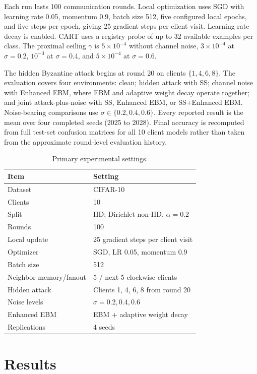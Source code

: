 \documentclass[conference]{IEEEtran}
\begin{document}
Each run lasts 100 communication rounds. Local optimization uses SGD with learning rate 0.05, momentum 0.9, batch size 512, five configured local epochs, and five steps per epoch, giving 25 gradient steps per client visit. Learning-rate decay is enabled. CART uses a registry probe of up to 32 available examples per class. The proximal ceiling $\gamma$ is $5\times10^{-4}$ without channel noise, $3\times10^{-4}$ at $\sigma=0.2$, $10^{-3}$ at $\sigma=0.4$, and $5\times10^{-4}$ at $\sigma=0.6$.

The hidden Byzantine attack begins at round 20 on clients $\{1,4,6,8\}$. The evaluation covers four environments: clean; hidden attack with SS; channel noise with Enhanced EBM, where EBM and adaptive weight decay operate together; and joint attack-plus-noise with SS, Enhanced EBM, or SS+Enhanced EBM. Noise-bearing comparisons use $\sigma\in\{0.2,0.4,0.6\}$. Every reported result is the mean over four completed seeds (2025 to 2028). Final accuracy is recomputed from full test-set confusion matrices for all 10 client models rather than taken from the approximate round-level evaluation history.

\begin{table}[t]
\caption{Primary experimental settings.}
\label{tab:setup}
\centering
\footnotesize
\setlength{\tabcolsep}{3.5pt}
\begin{tabular}{@{}ll@{}}
\toprule
\textbf{Item} & \textbf{Setting} \\
\midrule
Dataset & CIFAR-10 \\
Clients & 10 \\
Split & IID; Dirichlet non-IID, $\alpha=0.2$ \\
Rounds & 100 \\
Local update & 25 gradient steps per client visit \\
Optimizer & SGD, LR 0.05, momentum 0.9 \\
Batch size & 512 \\
Neighbor memory/fanout & 5 / next 5 clockwise clients \\
Hidden attack & Clients 1, 4, 6, 8 from round 20 \\
Noise levels & $\sigma=0.2,0.4,0.6$ \\
Enhanced EBM & EBM + adaptive weight decay \\
Replications & 4 seeds \\
\bottomrule
\end{tabular}
\end{table}


\section{Results}
\end{document}
